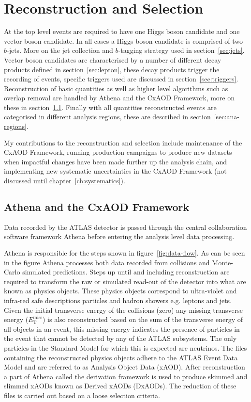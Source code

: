 \chapter{Reconstruction and Selection}%
\label{ch:recon}

At the top level events are required to have one Higgs boson candidate and one
vector boson candidate. In all cases a Higgs boson candidate is comprised of two
$b$-jets. More on the jet collection and $b$-tagging strategy used in
section~\ref{sec:jets}. Vector boson candidates are characterised by a number of
different decay products defined in section~\ref{sec:lepton}, these decay
products trigger the recording of events, specific triggers used are discussed
in section~\ref{sec:triggers}. Reconstruction of basic quantities as well as
higher level algorithms such as overlap removal are handled by Athena and the
CxAOD Framework, more on these in section~\ref{sec:cxaod}. Finally with all
quantities reconstructed events are categorised in different analysis regions,
these are described in section~\ref{sec:ana-regions}.

My contributions to the reconstruction and selection include maintenance of the
CxAOD Framework, running production campaigns to produce new datasets when
impactful changes have been made further up the analysis chain, and implementing
new systematic uncertainties in the CxAOD Framework (not discussed until
chapter~\ref{ch:systematics}).

\section{Athena and the CxAOD Framework}
\label{sec:cxaod}
Data recorded by the ATLAS detector is passed through the central collaboration
software framework Athena before entering the analysis level data processing.

Athena is responsible for the steps shown in figure~\ref{fig:data-flow}. As can
be seen in the figure Athena processes both data recorded from collisions and
Monte-Carlo simulated predictions. Steps up until and including reconstruction
are required to transform the raw or simulated read-out of the detector into
what are known as physics objects. These physics objects correspond to
ultra-violet and infra-red safe descriptions particles and hadron showers e.g.
leptons and jets. Given the initial transverse energy of the collisions (zero)
any missing transverse energy ($E_{\mathrm{T}}^{\text{miss}}$) is also reconstructed based
on the sum of the transverse energy of all objects in an event, this missing
energy indicates the presence of particles in the event that cannot be detected
by any of the ATLAS subsystems. The only particles in the Standard Model for
which this is expected are neutrinos. The files containing the reconstructed
physics objects adhere to the ATLAS Event Data Model and are referred to as
Analysis Object Data (xAOD). After reconstruction a part of Athena called the
derivation framework is used to produce skimmed and slimmed xAODs known as
Derived xAODs (DxAODs). The reduction of these files is carried out based on a
loose selection criteria.

